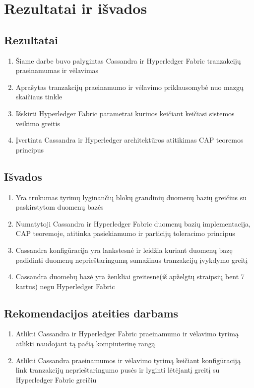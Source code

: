 \documentclass{VUMIFPSkursinis}
\begin{document}
\pagebreak
\section{Rezultatai ir išvados}
	\subsection{Rezultatai}
		\begin{enumerate}
			\item{Šiame darbe buvo palygintas Cassandra ir Hyperledger Fabric tranzakcijų praeinamumas ir vėlavimas}
			\item{Aprašytas tranzakcijų praeinamumo ir vėlavimo priklausomybė nuo mazgų skaičiaus tinkle}
			\item{Išskirti Hyperledger Fabric parametrai kuriuos keičiant keičiasi sistemos veikimo greitis}
			\item{Įvertinta Cassandra ir Hyperledger architektūros atitikimas CAP teoremos principus}
		\end{enumerate}
	\subsection{Išvados}
		\begin{enumerate}
			\item{Yra trūkumas tyrimų lyginančių blokų grandinių duomenų bazių greičius su paskirstytom duomenų bazės}
			\item{Numatytoji Cassandra ir Hyperledger Fabric duomenų bazių implementacija, CAP teoremoje, atitinka pasiekiamumo ir particijų toleracimo principus}
			\item{Cassandra konfigūracija yra lankstesnė ir leidžia kuriant duomenų bazę padidinti duomenų neprieštaringumą sumažinus tranzakcijų įvykdymo greitį}
			\item{Cassandra duomebų bazė yra ženkliai greitesnė(iš apželgtų straipsių bent 7 kartus) negu Hyperledger Fabric }
		\end{enumerate}
	\subsection{Rekomendacijos ateities darbams}
		\begin{enumerate}
			\item{Atlikti Cassandra ir Hyperledger Fabric praeinamumo ir vėlavimo tyrimą atlikti naudojant tą pačią kompiuterinę rangą}
			\item{Atlikti Cassandra praeinamumos ir vėlavimo tyrimą keičiant konfigūraciją link tranzakcijų neprieštaringumo pusės ir lyginti lėtėjantį greitį su Hyperledger Fabric greičiu}
		\end{enumerate}
\end{document}
